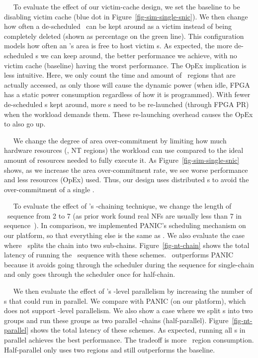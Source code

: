 ~~
To evaluate the effect of our victim-cache design, we set the baseline to be disabling victim cache (blue dot in Figure~\ref{fig-sim-single-snic}).
We then change how often a de-scheduled \nt\ can be kept around as a victim instead of being completely deleted (shown as percentage on the green line). 
This configuration models how often an \snic's area is free to host victim \nt{}s.
As expected, the more de-scheduled \nt{}s we can keep around, the better performance we achieve, with no victim cache (baseline) having the worst performance.
The OpEx implication is less intuitive.
Here, we only count the time and amount of \nt\ regions that are actually accessed, as only those will cause the dynamic power (when idle, FPGA has a static power consumption regardless of how it is programmed).
With fewer de-scheduled \nt{}s kept around, more \nt{}s need to be re-launched (through FPGA PR) when the workload demands them. 
These re-launching overhead causes the OpEx to also go up.

~~
We change the degree of area over-commitment by limiting how much hardware resources (\ie, NT regions) the workload can use compared to the ideal amount of resources needed to fully execute it.
As Figure~\ref{fig-sim-single-snic} shows, as we increase the area over-commitment rate, we see worse performance and less resources (OpEx) used. 
Thus, our design uses distributed \snic{}s to avoid the over-commitment of a single \snic.

~~
To evaluate the effect of \snic's \nt-chaining technique, we change the length of \nt\ sequence from 2 to 7 (as prior work found real NFs are usually less than 7 in sequence~\cite{NFP-sigcomm17}).
In comparison, we implemented PANIC's scheduling mechanism on our platform, so that everything else is the same as \snic.
We also evaluate the case where \snic\ splits the chain into two sub-chains.
Figure~\ref{fig-nt-chain} shows the total latency of running the \nt\ sequence with these schemes.
\snic\ outperforms PANIC because it avoids going through the scheduler during the sequence for single-chain and only goes through the scheduler once for half-chain.




~~
We then evaluate the effect of \snic's \nt-level parallelism by increasing the number of \nt{}s that could run in parallel.
We compare with PANIC (on our platform), which does not support \nt-level parallelism.
We also show a case where we split \nt{}s into two groups and run these groups as two parallel \nt-chains (half-parallel).
Figure~\ref{fig-nt-parallel} shows the total latency of these schemes.
As expected, running all \nt{}s in parallel achieves the best performance.
The tradeoff is more \nt\ region consumption.
Half-parallel only uses two regions and still outperforms the baseline. %


